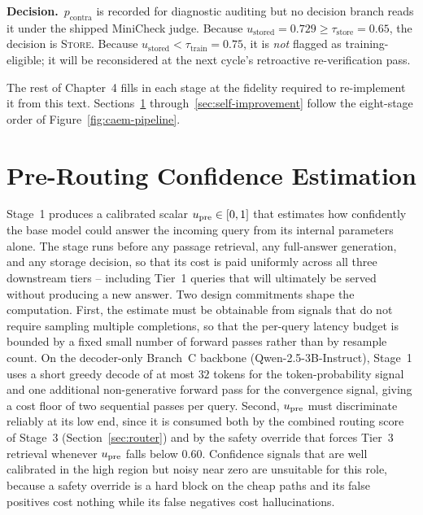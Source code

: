 \begin{tcolorbox}
\medskip
\noindent\textcolor{orange!75!black}{\textbf{Decision.}}\ $p_{\text{contra}}$ is recorded for diagnostic auditing but no decision branch reads it under the shipped MiniCheck judge. Because $u_{\text{stored}} = 0.729 \geq \tau_{\text{store}} = 0.65$, the decision is \textsc{Store}. Because $u_{\text{stored}} < \tau_{\text{train}} = 0.75$, it is \emph{not} flagged as training-eligible; it will be reconsidered at the next cycle's retroactive re-verification pass.

\end{tcolorbox}

The rest of Chapter~4 fills in each stage at the fidelity required to re-implement it from this text. Sections~\ref{sec:pre-route} through~\ref{sec:self-improvement} follow the eight-stage order of Figure~\ref{fig:caem-pipeline}.

\section{Pre-Routing Confidence Estimation}
\label{sec:pre-route}

Stage~1 produces a calibrated scalar $u_{\text{pre}} \in [0,1]$ that estimates how confidently the base model could answer the incoming query from its internal parameters alone. The stage runs before any passage retrieval, any full-answer generation, and any storage decision, so that its cost is paid uniformly across all three downstream tiers -- including Tier~1 queries that will ultimately be served without producing a new answer. Two design commitments shape the computation. First, the estimate must be obtainable from signals that do not require sampling multiple completions, so that the per-query latency budget is bounded by a fixed small number of forward passes rather than by resample count. On the decoder-only Branch~C backbone (Qwen-2.5-3B-Instruct), Stage~1 uses a short greedy decode of at most $32$ tokens for the token-probability signal and one additional non-generative forward pass for the convergence signal, giving a cost floor of two sequential passes per query. Second, $u_{\text{pre}}$ must discriminate reliably at its low end, since it is consumed both by the combined routing score of Stage~3 (Section~\ref{sec:router}) and by the safety override that forces Tier~3 retrieval whenever $u_{\text{pre}}$ falls below $0.60$. Confidence signals that are well calibrated in the high region but noisy near zero are unsuitable for this role, because a safety override is a hard block on the cheap paths and its false positives cost nothing while its false negatives cost hallucinations.

